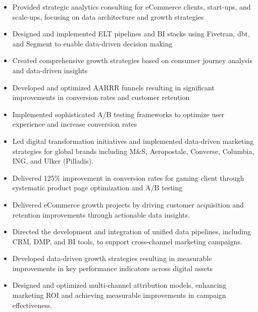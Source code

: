 \documentclass[10pt,a4paper,ragged2e,withhyper]{altacv}
\begin{document}
\begin{paracol}{2}
\begin{itemize}
\item Provided strategic analytics consulting for eCommerce clients, start-ups, and scale-ups, focusing on data architecture and growth strategies
\item Designed and implemented ELT pipelines and BI stacks using Fivetran, dbt, and Segment to enable data-driven decision making
\item Created comprehensive growth strategies based on consumer journey analysis and data-driven insights
\item Developed and optimized AARRR funnels resulting in significant improvements in conversion rates and customer retention
\item Implemented sophisticated A/B testing frameworks to optimize user experience and increase conversion rates
\end{itemize}

\divider

\begin{itemize}
\item Led digital transformation initiatives and implemented data-driven marketing strategies for global brands including M\&S, Aeropostale, Converse, Columbia, ING, and Ulker (Pilladis).
\item Delivered 125\% improvement in conversion rates for gaming client through systematic product page optimization and A/B testing
\item Delivered eCommerce growth projects by driving customer acquisition and retention improvements through actionable data insights.
\item Directed the development and integration of unified data pipelines, including CRM, DMP, and BI tools, to support cross-channel marketing campaigns.
\item Developed data-driven growth strategies resulting in measurable improvements in key performance indicators across digital assets
\item Designed and optimized multi-channel attribution models, enhancing marketing ROI and achieving measurable improvements in campaign effectiveness.
\end{itemize}

\divider


\end{paracol}
\end{document}
